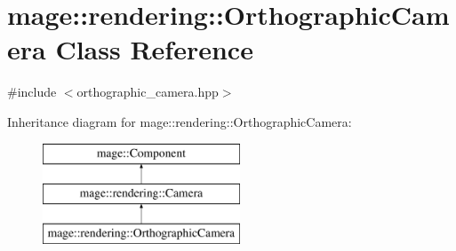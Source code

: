 \hypertarget{classmage_1_1rendering_1_1_orthographic_camera}{}\section{mage\+:\+:rendering\+:\+:Orthographic\+Camera Class Reference}
\label{classmage_1_1rendering_1_1_orthographic_camera}


{\ttfamily \#include $<$orthographic\+\_\+camera.\+hpp$>$}

Inheritance diagram for mage\+:\+:rendering\+:\+:Orthographic\+Camera\+:\begin{figure}[H]
\begin{center}
\leavevmode
\includegraphics[height=3.000000cm]{classmage_1_1rendering_1_1_orthographic_camera}
\end{center}
\end{figure}
